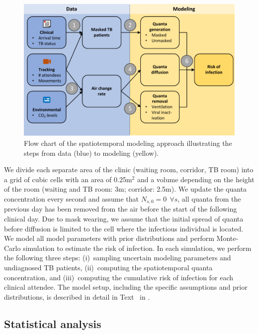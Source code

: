 \documentclass[fleqn,11pt]{wlscirep}
\begin{document}
\begin{figure}[!htpb]
    \centering
    \includegraphics{doc/paper/flow-chart.pdf}
    \caption{Flow chart of the spatiotemporal modeling approach illustrating the steps from data (blue) to modeling (yellow).}
    \label{fig:modeling-flow}
\end{figure}

We divide each separate area of the clinic (waiting room, corridor, TB room) into a grid of cubic cells with an area of 0.25m$^2$ and a volume depending on the height of the room (waiting and TB room: 3m; corridor: 2.5m). We update the quanta concentration every second and assume that $N_{s,0} = 0 ~~ \forall s$, \ie all quanta from the previous day has been removed from the air before the start of the following clinical day. Due to mask wearing, we assume that the initial spread of quanta before diffusion is limited to the cell where the infectious individual is located. We model all model parameters with prior distributions and perform Monte-Carlo simulation to estimate the risk of infection. In each simulation, we perform the following three steps: (i)~sampling uncertain modeling parameters and undiagnosed TB patients, (ii)~computing the spatiotemporal quanta concentration, and (iii)~computing the cumulative risk of infection for each clinical attendee. The model setup, including the specific assumptions and prior distributions, is described in detail in Text~ in \supp.



\subsection{Statistical analysis}
\end{document}

